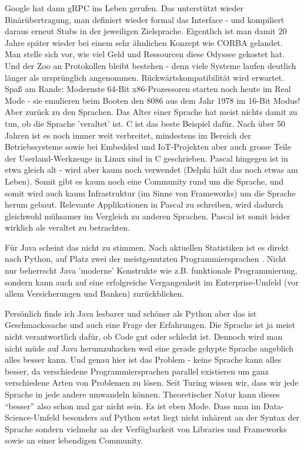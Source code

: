 Google hat dann gRPC ins Leben gerufen. Das unterstützt wieder Binärübertragung, 
man definiert wieder formal das Interface - und kompiliert daraus erneut Stubs 
in der jeweiligen Zielsprache. Eigentlich ist man damit 20 Jahre später wieder 
bei einem sehr ähnlichen Konzept wie CORBA gelandet. Man stelle sich vor, wie 
viel Geld und Ressourcen diese Odyssee gekostet hat. Und der Zoo an Protokollen 
bleibt bestehen - denn viele Systeme laufen deutlich länger als ursprünglich 
angenommen. Rückwärtskompatibilität wird erwartet.
Spaß am Rande: Modernste 64-Bit x86-Prozessoren starten noch heute im Real Mode 
- sie emulieren beim Booten den 8086 aus dem Jahr 1978 im 16-Bit Modus!
\\
Aber zurück zu den Sprachen. Das Alter einer Sprache hat meist nichts damit zu
tun, ob die Sprache 'veraltet' ist. C ist das beste Beispiel dafür. 
Nach über 50 Jahren ist es noch immer weit verbreitet, mindestens im Bereich der
Betriebssysteme sowie bei Embedded und IoT-Projekten aber auch grosse Teile der 
Userland-Werkzeuge in Linux sind in C geschrieben. Pascal hingegen ist in 
etwa gleich alt - wird aber kaum noch verwendet (Delphi hält das noch etwas am 
Leben). Somit gibt es kaum noch eine Community rund um die Sprache, und somit 
wird auch kaum Infrastruktur (im Sinne von Frameworks) um die Sprache herum 
gebaut. Relevante Applikationen in Pascal zu schreiben, wird dadurch gleichwohl
mühsamer im Vergleich zu anderen Sprachen. Pascal ist somit leider wirklich
als veraltet zu betrachten.

Für Java scheint das nicht zu stimmen. Nach aktuellen Statistiken ist es direkt 
nach Python, auf Platz zwei der meistgenutzten Programmiersprachen 
\cite{statista_2025}. Nicht nur beherrscht Java 'moderne' Konstrukte wie z.B. 
funktionale Programmierung, sondern kann auch auf eine erfolgreiche Vergangenheit
im Enterprise-Umfeld (vor allem Versicherungen und Banken) zurückblicken.

Persönlich finde ich Java lesbarer und schöner als Python aber das ist
Geschmackssache und auch eine Frage der Erfahrungen. Die Sprache ist ja meist
nicht verantwortlich dafür, ob Code gut oder schlecht ist. Dennoch wird man
nicht müde auf Java herumzuhacken weil eine gerade gehypte Sprache angeblich 
alles besser kann. Und genau hier ist das Problem - keine Sprache kann alles
besser, da verschiedene Programmiersprachen parallel existieren um ganz
verschiedene Arten von Problemen zu lösen. Seit Turing wissen wir, dass wir
jede Sprache in jede andere umwandeln können. Theoretischer Natur kann dieses 
``besser'' also schon mal gar nicht sein. Es ist eben Mode. Dass man im 
Data-Science-Umfeld besonders auf Python setzt liegt nicht inhärent an der
Syntax der Sprache sondern vielmehr an der Verfügbarkeit von Libraries und
Frameworks sowie an einer lebendigen Community. 

